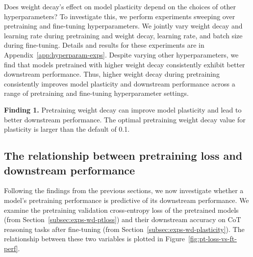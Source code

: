 Does weight decay's effect on model plasticity depend on the choices of other hyperparameters? To investigate this, we perform experiments sweeping over pretraining and fine-tuning hyperparameters. We jointly vary weight decay and learning rate during pretraining and weight decay, learning rate, and batch size during fine-tuning. 
Details and results for these experiments are in Appendix~\ref{app:hyperparam-exps}.
Despite varying other hyperparameters, we find that models pretrained with higher weight decay consistently exhibit better downstream performance.
Thus, higher weight decay during pretraining consistently improves model plasticity and downstream performance across a range of pretraining and fine-tuning hyperparameter settings.

\begin{finding}
\textbf{Finding 1.} Pretraining weight decay can improve model plasticity and lead to better downstream performance. The optimal pretraining weight decay value for plasticity is larger than the default of 0.1.
\end{finding}







\subsection{The relationship between pretraining loss and downstream performance} 
\label{subsec:exps-ptloss-vs-ftperf}





Following the findings from the previous sections, we now investigate whether a model's pretraining performance is predictive of its downstream performance. 
We examine the pretraining validation cross-entropy loss of the pretrained models (from Section~\ref{subsec:exps-wd-ptloss}) and their downstream accuracy on CoT reasoning tasks after fine-tuning (from Section~\ref{subsec:exps-wd-plasticity}). The relationship between these two variables is plotted in Figure~\ref{fig:pt-loss-vs-ft-perf}. 

